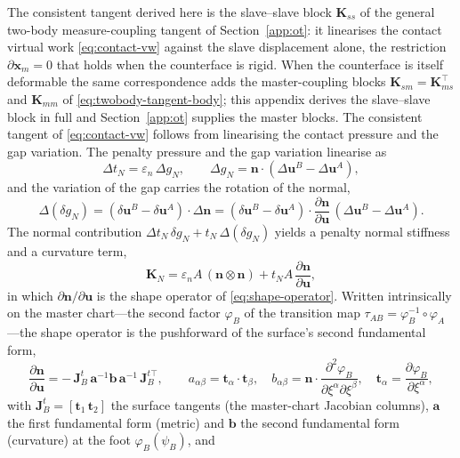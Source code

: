 \documentclass{svjour3}                 %
\newcommand{\nbf}{\bm{n}}
\newcommand{\tbf}{\bm{t}}
\newcommand{\xbf}{\bm{x}}
\newcommand{\ubf}{\bm{u}}
\newcommand{\gn}{g_{\scriptscriptstyle N}}
\newcommand{\tmap}{\tau_{AB}}
\newcommand{\map}[1]{\varphi_{#1}}
\begin{document}
\begin{appendix}
The consistent tangent derived here is the slave--slave block $\bm K_{ss}$ of the general two-body
measure-coupling tangent of Section~\ref{app:ot}: it linearises the contact virtual work \eqref{eq:contact-vw}
against the slave displacement alone, the restriction $\partial\xbf_m=0$ that holds when the counterface is rigid.
When the counterface is itself deformable the same correspondence adds the master-coupling blocks
$\bm K_{sm}=\bm K_{ms}^{\top}$ and $\bm K_{mm}$ of \eqref{eq:twobody-tangent-body}; this appendix derives the
slave--slave block in full and Section~\ref{app:ot} supplies the master blocks.
The consistent tangent of \eqref{eq:contact-vw} follows from linearising the contact
pressure and the gap variation. The penalty pressure and the gap variation linearise as
\begin{equation}\label{eq:lin-pressure}
\Delta t_N=\varepsilon_n\,\Delta\gn,\qquad
\Delta\gn=\nbf\cdot(\Delta\ubf^B-\Delta\ubf^A),
\end{equation}
and the variation of the gap carries the rotation of the normal,
\begin{equation}\label{eq:lin-gapvar}
\Delta(\delta\gn)=(\delta\ubf^B-\delta\ubf^A)\cdot\Delta\nbf
=(\delta\ubf^B-\delta\ubf^A)\cdot\frac{\partial\nbf}{\partial\ubf}\,(\Delta\ubf^B-\Delta\ubf^A).
\end{equation}
The normal contribution $\Delta t_N\,\delta\gn+t_N\,\Delta(\delta\gn)$ yields a penalty normal stiffness and a
curvature term,
\begin{equation}\label{eq:lin-normal}
\bm K_N=\varepsilon_n A\,(\nbf\otimes\nbf)+t_N A\,\frac{\partial\nbf}{\partial\ubf},
\end{equation}
in which $\partial\nbf/\partial\ubf$ is the shape operator of \eqref{eq:shape-operator}. Written intrinsically on
the master chart---the second factor $\map{B}$ of the transition map $\tmap=\map{B}^{-1}\circ\map{A}$---the shape
operator is the pushforward of the surface's second fundamental form,
\begin{equation}\label{eq:weingarten-chart}
\frac{\partial\nbf}{\partial\ubf}=-\,\bm J_B^{t}\,\bm a^{-1}\bm b\,\bm a^{-1}\,\bm J_B^{t\top},\qquad
a_{\alpha\beta}=\tbf_\alpha\!\cdot\!\tbf_\beta,\quad
b_{\alpha\beta}=\nbf\!\cdot\!\frac{\partial^2\map{B}}{\partial\xi^\alpha\partial\xi^\beta},\quad
\tbf_\alpha=\frac{\partial\map{B}}{\partial\xi^\alpha},
\end{equation}
with $\bm J_B^{t}=[\tbf_1\,\tbf_2]$ the surface tangents (the master-chart Jacobian columns), $\bm a$ the first
fundamental form (metric) and $\bm b$ the second fundamental form (curvature) at the foot $\map{B}(\psi_B)$, and

\end{appendix}
\end{document}
